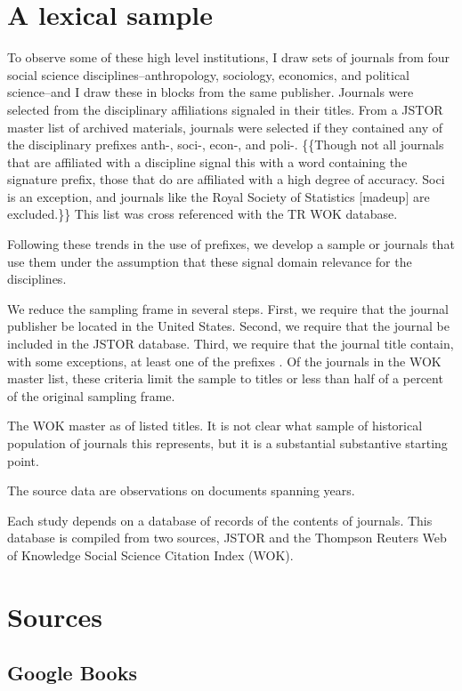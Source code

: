 \section{A lexical sample}\label{a-lexical-sample}

To observe some of these high level institutions, I draw sets of
journals from four social science disciplines--anthropology, sociology,
economics, and political science--and I draw these in blocks from the
same publisher. Journals were selected from the disciplinary
affiliations signaled in their titles. From a JSTOR master list of
archived materials, journals were selected if they contained any of the
disciplinary prefixes anth-, soci-, econ-, and poli-. \{\{Though not all
journals that are affiliated with a discipline signal this with a word
containing the signature prefix, those that do are affiliated with a
high degree of accuracy. Soci is an exception, and journals like the
Royal Society of Statistics {[}madeup{]} are excluded.\}\} This list was
cross referenced with the TR WOK database.

Following these trends in the use of prefixes, we develop a sample or
journals that use them under the assumption that these signal domain
relevance for the disciplines.

We reduce the sampling frame in several steps. First, we require that
the journal publisher be located in the United States. Second, we
require that the journal be included in the JSTOR database. Third, we
require that the journal title contain, with some exceptions, at least
one of the prefixes . Of the journals in the WOK master list, these
criteria limit the sample to titles or less than half of a percent of
the original sampling frame.

The WOK master as of listed titles. It is not clear what sample of
historical population of journals this represents, but it is a
substantial substantive starting point.

The source data are observations on documents spanning years.

Each study depends on a database of records of the contents of journals.
This database is compiled from two sources, JSTOR and the Thompson
Reuters Web of Knowledge Social Science Citation Index (WOK).

\section{Sources}\label{sources}

\subsection{Google Books}\label{google-books}

